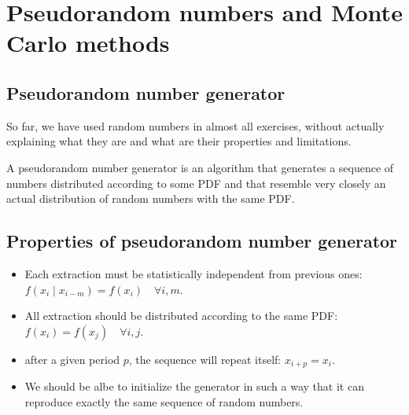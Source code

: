 

\section{Pseudorandom numbers and Monte Carlo methods}
\label{sec:pseudorandom_number}

\subsection{Pseudorandom number generator}
\label{subsec:pseudorandom_number_generator}

So far, we have used random numbers in almost all exercises, without actually explaining what they are and what are their properties and limitations. 

A pseudorandom number generator is an algorithm that generates a sequence of numbers distributed according to some PDF and that resemble very closely an actual distribution of random numbers with the same PDF.

\subsection{Properties of pseudorandom number generator}
\label{subsec:prop_of_pseudorandom_number_generator}

\begin{itemize}[$\to$]
	\item Each extraction must be statistically independent from previous ones: $f(x_{i} \mid x_{i - m}) = f(x_{i}) \quad \forall i, m$.
	\item All extraction should be distributed according to the same PDF: $f(x_{i}) = f(x_{j}) \quad \forall i, j$.
	\item after a given period $p$, the sequence will repeat itself: $x_{i + p} = x_{i}$.
	\item We should be albe to initialize the generator in such a way that it can reproduce exactly the same sequence of random numbers.
\end{itemize}

